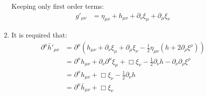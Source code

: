 \documentclass[12pt,a4]{article}
\begin{document}
\begin{enumerate}
\begin{enumerate}
        Keeping only first order terms:
        \begin{align*}
          g'_{\mu\nu} &= \eta_{\mu\nu} + h_{\mu\nu} + \partial_\nu \xi_\mu + \partial _\mu \xi_\nu 
        \end{align*}
      \item 
        It is required that:
        \begin{align*}
          \partial^\mu \bar{h}'_{\mu\nu} &= \partial^\mu \left(h_{\mu\nu} + \partial_\nu \xi_\mu + \partial _\mu \xi_\nu -\frac{1}{2}\eta_{\mu\nu}(h + 2\partial_\rho \xi^\rho)\right)\\
                                         &= \partial^\mu h_{\mu\nu} + \partial_\nu\partial^\mu \xi_\mu + \Box \xi_\nu -\frac{1}{2}\partial_\nu h - \partial_\nu \partial_\rho \xi^\rho\\
                                         &= \partial^\mu h_{\mu\nu}  + \Box \xi_\nu -\frac{1}{2}\partial_\nu h \\
                                         &= \partial^\mu \bar{h}_{\mu\nu}  + \Box \xi_\nu \\
        \end{align*}
    \end{enumerate}
\end{enumerate}
\end{document}
